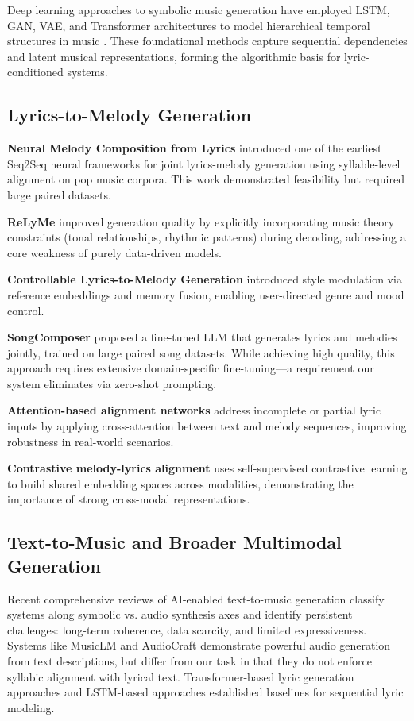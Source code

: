 \documentclass[conference]{IEEEtran}
\begin{document}
Deep learning approaches to symbolic music generation have employed LSTM, GAN,
VAE, and Transformer architectures to model hierarchical temporal structures in
music \cite{briot2020}. These foundational methods capture sequential
dependencies and latent musical representations, forming the algorithmic basis
for lyric-conditioned systems.

\subsection{Lyrics-to-Melody Generation}

\textbf{Neural Melody Composition from Lyrics} \cite{bao2018} introduced one
of the earliest Seq2Seq neural frameworks for joint lyrics-melody generation
using syllable-level alignment on pop music corpora. This work demonstrated
feasibility but required large paired datasets.

\textbf{ReLyMe} \cite{zhang2022relyme} improved generation quality by
explicitly incorporating music theory constraints (tonal relationships, rhythmic
patterns) during decoding, addressing a core weakness of purely data-driven
models.

\textbf{Controllable Lyrics-to-Melody Generation} \cite{zhang2023controllable}
introduced style modulation via reference embeddings and memory fusion,
enabling user-directed genre and mood control.

\textbf{SongComposer} \cite{ding2024songcomposer} proposed a fine-tuned LLM
that generates lyrics and melodies jointly, trained on large paired song
datasets. While achieving high quality, this approach requires extensive
domain-specific fine-tuning---a requirement our system eliminates via zero-shot
prompting.

\textbf{Attention-based alignment networks} \cite{reddy2023} address incomplete
or partial lyric inputs by applying cross-attention between text and melody
sequences, improving robustness in real-world scenarios.

\textbf{Contrastive melody-lyrics alignment} \cite{wang2025} uses
self-supervised contrastive learning to build shared embedding spaces across
modalities, demonstrating the importance of strong cross-modal representations.

\subsection{Text-to-Music and Broader Multimodal Generation}

Recent comprehensive reviews of AI-enabled text-to-music generation \cite{li2025}
classify systems along symbolic vs. audio synthesis axes and identify persistent
challenges: long-term coherence, data scarcity, and limited expressiveness.
Systems like MusicLM and AudioCraft demonstrate powerful audio generation from
text descriptions, but differ from our task in that they do not enforce
syllabic alignment with lyrical text. Transformer-based lyric generation
approaches \cite{mediakov2024} and LSTM-based approaches \cite{gill2020}
established baselines for sequential lyric modeling.
\end{document}
